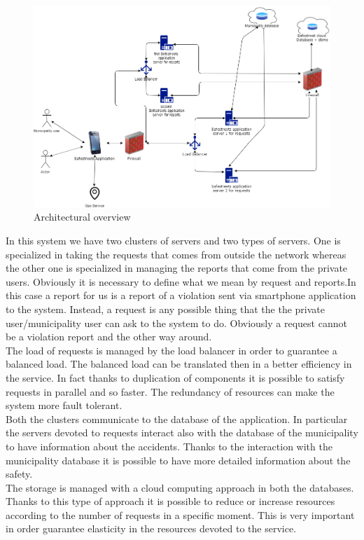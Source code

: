 \documentclass[titlepage]{article}
\begin{document}
\begin{figure}[h]
	\includegraphics[scale=0.465]{Diagrams/overview.png}
	\caption{Architectural overview}
\end{figure}
\FloatBarrier

In this system we have two clusters of servers and two types of servers. One is specialized in taking the requests that comes from outside the network whereas the other one is specialized in managing the reports that come from the private users. Obviously it is necessary to define what we mean by request and reports.In this case a report for us is a report of a violation sent via smartphone application to the system. Instead, a request is any possible thing that the the private user/municipality user can ask to the system to do. Obviously a request cannot be a violation report and the other way around.\\
 The load of requests is managed by the load balancer in order to guarantee a balanced load. The balanced load can be translated then in a better efficiency in the service. In fact thanks to duplication of components it is possible to satisfy requests in parallel and so faster. The redundancy of resources can make the system more fault tolerant.\\
 Both the clusters communicate to the database of the application. In particular the servers devoted to requests interact also with the database of the municipality to have information about the accidents. Thanks to the interaction with the municipality database it is possible to have more detailed information about the safety.\\
The storage is managed with a cloud computing approach in both the databases. Thanks to this type of approach it is possible to reduce or increase resources according to the number of requests in a specific moment. This is very important in order guarantee elasticity in the resources devoted to the service.\\ 
\end{document}
